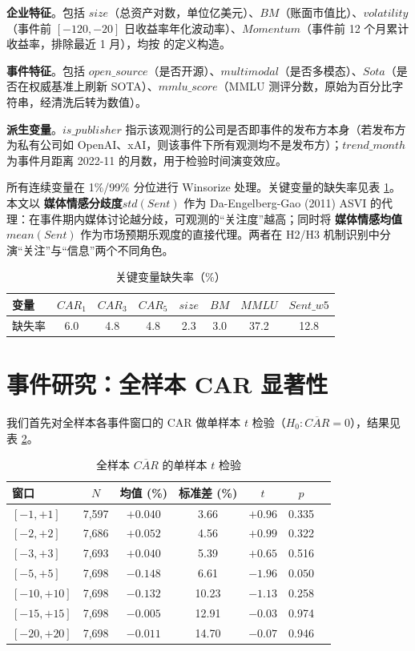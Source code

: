 \documentclass[11pt]{ctexart}
\begin{document}
\textbf{企业特征}。包括 $size$（总资产对数，单位亿美元）、$BM$（账面市值比）、$volatility$（事件前 $[-120,-20]$ 日收益率年化波动率）、$Momentum$（事件前 12 个月累计收益率，排除最近 1 月），均按 \cite{Carhart1997} 的定义构造。

\textbf{事件特征}。包括 $open\_source$（是否开源）、$multimodal$（是否多模态）、$Sota$（是否在权威基准上刷新 SOTA）、$mmlu\_score$（MMLU 测评分数，原始为百分比字符串，经清洗后转为数值）。

\textbf{派生变量}。$is\_publisher$ 指示该观测行的公司是否即事件的发布方本身（若发布方为私有公司如 OpenAI、xAI，则该事件下所有观测均不是发布方）；$trend\_month$ 为事件月距离 2022-11 的月数，用于检验时间演变效应。

所有连续变量在 1\%/99\% 分位进行 Winsorize 处理。关键变量的缺失率见表 \ref{tab:missing}。本文以 \textbf{媒体情感分歧度}$std(Sent)$ 作为 Da-Engelberg-Gao (2011) ASVI 的代理：在事件期内媒体讨论越分歧，可观测的“关注度”越高；同时将 \textbf{媒体情感均值}$mean(Sent)$ 作为市场预期乐观度的直接代理。两者在 H2/H3 机制识别中分演“关注”与“信息”两个不同角色。

\begin{table}[htbp]
\centering
\caption{关键变量缺失率（\%）}
\label{tab:missing}
\small
\begin{tabular}{lccccccc}
\toprule
变量 & $CAR_{1}$ & $CAR_{3}$ & $CAR_{5}$ & $size$ & $BM$ & $MMLU$ & $Sent\_w5$ \\
\midrule
缺失率 & 6.0 & 4.8 & 4.8 & 2.3 & 3.0 & 37.2 & 12.8 \\
\bottomrule
\end{tabular}
\end{table}

\section{事件研究：全样本 CAR 显著性}
\label{sec:event}

我们首先对全样本各事件窗口的 CAR 做单样本 $t$ 检验（$H_0:\overline{CAR}=0$），结果见表 \ref{tab:car_tt}。

\begin{table}[htbp]
\centering
\caption{全样本 $\overline{CAR}$ 的单样本 $t$ 检验}
\label{tab:car_tt}
\small
\begin{tabular}{lcccccc}
\toprule
窗口 & $N$ & 均值 (\%) & 标准差 (\%) & $t$ & $p$ \\
\midrule
$[-1,+1]$   & 7{,}597 & $+0.040$ & 3.66 & $+0.96$ & 0.335 \\
$[-2,+2]$   & 7{,}686 & $+0.052$ & 4.56 & $+0.99$ & 0.322 \\
$[-3,+3]$   & 7{,}693 & $+0.040$ & 5.39 & $+0.65$ & 0.516 \\
$[-5,+5]$   & 7{,}698 & $\mathbf{-0.148}$ & 6.61 & $\mathbf{-1.96}$ & $\mathbf{0.050}$ \\
$[-10,+10]$ & 7{,}698 & $-0.132$ & 10.23 & $-1.13$ & 0.258 \\
$[-15,+15]$ & 7{,}698 & $-0.005$ & 12.91 & $-0.03$ & 0.974 \\
$[-20,+20]$ & 7{,}698 & $-0.011$ & 14.70 & $-0.07$ & 0.946 \\
\bottomrule
\end{tabular}
\end{table}
\end{document}
